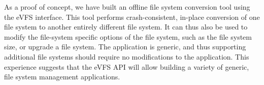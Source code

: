 As a proof of concept, we have built an offline file system conversion tool using the eVFS interface. This tool performs crash-consistent, in-place conversion of one file system to another entirely different file system. It can thus also be used to modify the file-system specific options of the file system, such as the file system size, or upgrade a file system. The application is generic, and thus supporting additional file systems should require no modifications to the application. This experience suggests that the eVFS API will allow building a variety of generic, file system management applications.



